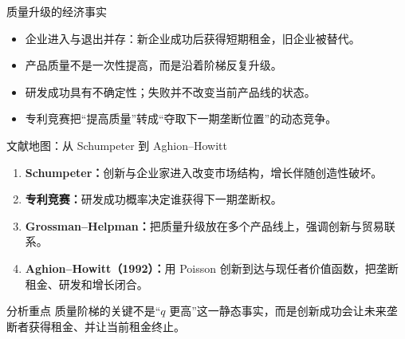 \documentclass[aspectratio=32]{beamer}
\begin{document}
\begin{frame}{质量升级的经济事实}
\small
\begin{itemize}
  \item 企业进入与退出并存：新企业成功后获得短期租金，旧企业被替代。
  \item 产品质量不是一次性提高，而是沿着阶梯反复升级。
  \item 研发成功具有不确定性；失败并不改变当前产品线的状态。
  \item 专利竞赛把“提高质量”转成“夺取下一期垄断位置”的动态竞争。
\end{itemize}
\vspace{0.18cm}
\begin{center}
\end{center}
\end{frame}

\begin{frame}{文献地图：从 Schumpeter 到 Aghion--Howitt}
\small
\begin{enumerate}
  \item \textbf{Schumpeter：}创新与企业家进入改变市场结构，增长伴随创造性破坏。
  \item \textbf{专利竞赛：}研发成功概率决定谁获得下一期垄断权。
  \item \textbf{Grossman--Helpman：}把质量升级放在多个产品线上，强调创新与贸易联系。
  \item \textbf{Aghion--Howitt（1992）：}用 Poisson 创新到达与现任者价值函数，把垄断租金、研发和增长闭合。
\end{enumerate}
\begin{block}{分析重点}
质量阶梯的关键不是“$q$ 更高”这一静态事实，而是创新成功会让未来垄断者获得租金、并让当前租金终止。
\end{block}
\end{frame}
\end{document}
